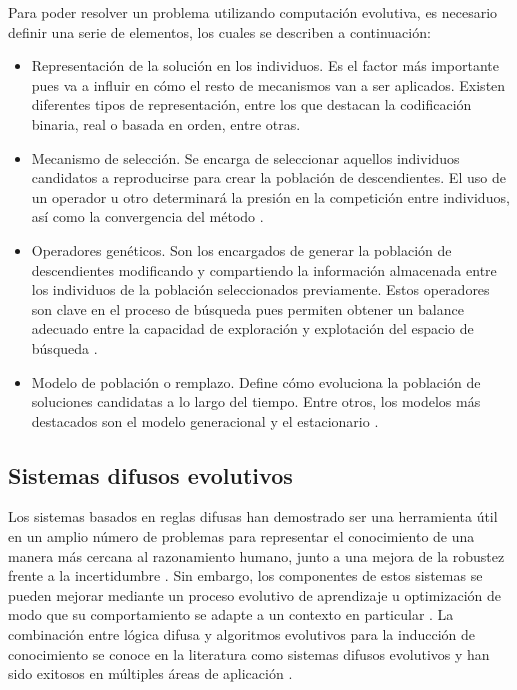\documentclass[c5paper,10pt,twoside]{book}	   	%
\begin{document}
Para poder resolver un problema utilizando computación evolutiva, es necesario definir una serie de elementos, los cuales se describen a continuación:

\begin{itemize}
	\item Representación de la solución en los individuos. Es el factor más importante pues va a influir en cómo el resto de mecanismos van a ser aplicados. Existen diferentes tipos de representación, entre los que destacan la codificación binaria, real o basada en orden, entre otras.
	
	\item Mecanismo de selección. Se encarga de seleccionar aquellos individuos candidatos a reproducirse para crear la población de descendientes. El uso de un operador u otro determinará la presión en la competición entre individuos, así como la convergencia del método \cite{Gd91}.
	
	\item Operadores genéticos. Son los encargados de generar la población de descendientes modificando y compartiendo la información almacenada entre los individuos de la población seleccionados previamente. Estos operadores son clave en el proceso de búsqueda pues permiten obtener un balance adecuado entre la capacidad de exploración y explotación del espacio de búsqueda \cite{Vlm13}. 
	
	\item Modelo de población o remplazo. Define cómo evoluciona la población de soluciones candidatas a lo largo del tiempo. Entre otros, los modelos  más destacados son el modelo generacional y el estacionario \cite{Es03}. 
\end{itemize}


\subsection{Sistemas difusos evolutivos}

Los sistemas basados en reglas difusas han demostrado ser una herramienta útil en un amplio número de problemas para representar el conocimiento de una manera más cercana al razonamiento humano, junto a una mejora de la robustez frente a la incertidumbre \cite{Guillaume01,Gah11, Fhcdm19}. Sin embargo, los componentes de estos sistemas se pueden mejorar mediante un proceso evolutivo de aprendizaje u optimización de modo que su comportamiento se adapte a un contexto en particular \cite{Fldh15}. La combinación entre lógica difusa y algoritmos evolutivos para la inducción de conocimiento se conoce en la literatura como sistemas difusos evolutivos y han sido exitosos en múltiples áreas de aplicación \cite{Chhm01,Cghhm04,Her08,Cor11,Fldh15,Fcdh16}.
\end{document}
